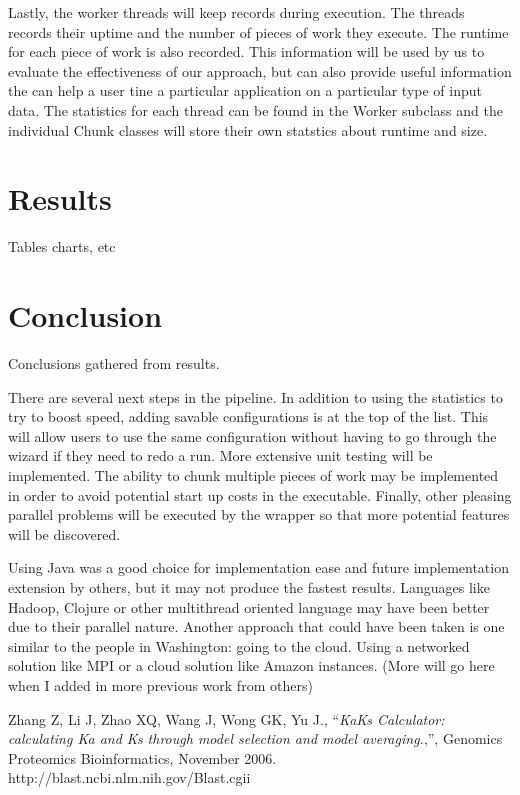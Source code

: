 \documentclass[12pt]{article}
\begin{document}
Lastly, the worker threads will keep records during execution. The threads 
records their uptime and the number of pieces of work they execute. The runtime 
for each piece of work is also recorded. This information will be used by us to
evaluate the effectiveness of our approach, but can also provide useful
information the can help a user tine a particular application on a particular
type of input data. The statistics for each thread can be found in the Worker 
subclass and the individual Chunk classes will store their own statstics about 
runtime and size.

\section{Results}

Tables charts, etc

\section{Conclusion}

Conclusions gathered from results.

There are several next steps in the pipeline. In addition to using the
statistics to try to boost speed, adding savable configurations is at the top of
the list. This will allow users to use the same configuration without having to
go through the wizard if they need to redo a run. More extensive unit testing
will be implemented. The ability to chunk multiple pieces of work may be
implemented in order to avoid potential start up costs in the executable. 
Finally, other pleasing parallel problems will be executed by the wrapper so 
that more potential features will be discovered. 

Using Java was a good choice for implementation ease and future implementation
extension by others, but it may not produce the fastest results. Languages
like Hadoop, Clojure or other multithread oriented language may have been better
due to their parallel nature. Another approach that could have been taken is one
similar to the people in Washington: going to the cloud. Using a networked 
solution like MPI or a cloud solution like Amazon instances. (More will go here
when I added in more previous work from others)

\begin{thebibliography}{1}
Zhang Z, Li J, Zhao XQ, Wang J, Wong GK, Yu J., ``\emph{KaKs Calculator: 
calculating Ka and Ks through model selection and model averaging.},'',
Genomics Proteomics Bioinformatics, November 2006.
http://blast.ncbi.nlm.nih.gov/Blast.cgii
\end{thebibliography}
\end{document}
